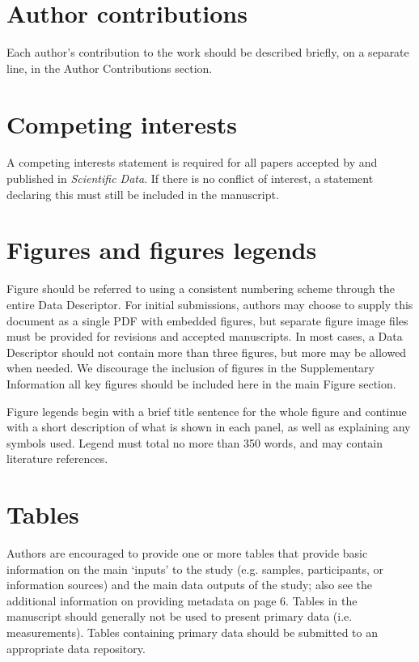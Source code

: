 \documentclass[a4paper,10pt,english]{article}
\begin{document}
\section*{Author contributions}

Each author’s contribution to the work should be described briefly, on a separate line, in the Author Contributions section. 

\section*{Competing interests}

A competing interests statement is required for all papers accepted by and published in \emph{Scientific Data}. If there is no conflict of interest, a statement declaring this must still be included in the manuscript.


\section*{Figures and figures legends}

Figure should be referred to using a consistent numbering scheme through
the entire Data Descriptor. For initial submissions, authors may choose
to supply this document as a single PDF with embedded figures, but
separate figure image files must be provided for revisions and accepted
manuscripts. In most cases, a Data Descriptor should not contain more
than three figures, but more may be allowed when needed. We discourage
the inclusion of figures in the Supplementary Information \textendash{}
all key figures should be included here in the main Figure section. 

Figure legends begin with a brief title sentence for the whole figure
and continue with a short description of what is shown in each panel,
as well as explaining any symbols used. Legend must total no more
than 350 words, and may contain literature references. 


\section*{Tables}

Authors are encouraged to provide one or more tables that provide basic information on the main ‘inputs’ to the study (e.g. samples, participants, or information sources) and the main data outputs of the study; also see the additional information on providing metadata on page 6. Tables in the manuscript should generally not be used to present primary data (i.e. measurements). Tables containing primary data should be submitted to an appropriate data repository.
\end{document}
